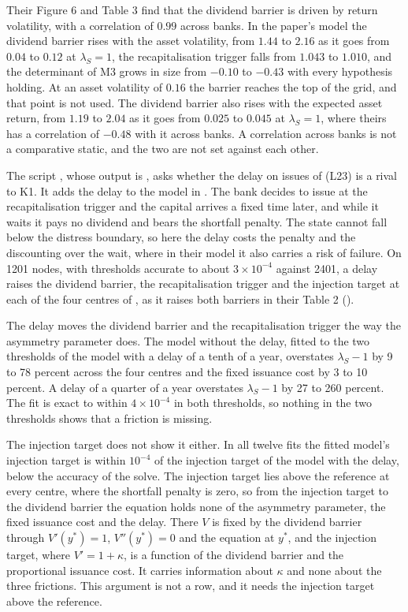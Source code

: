 Their Figure 6 and Table 3 find that the dividend barrier is driven by return
volatility, with a correlation of $0.99$ across banks. In the paper's model the
dividend barrier rises with the asset volatility, from $1.44$ to $2.16$ as it
goes from $0.04$ to $0.12$ at $\lambda_S=1$, the recapitalisation trigger falls
from $1.043$ to $1.010$, and the determinant of M3 grows in size from $-0.10$
to $-0.43$ with every hypothesis holding. At an asset volatility of $0.16$ the
barrier reaches the top of the grid, and that point is not used. The dividend
barrier also rises with the expected asset return, from $1.19$ to $2.04$ as it
goes from $0.025$ to $0.045$ at $\lambda_S=1$, where theirs has a correlation
of $-0.48$ with it across banks. A correlation across banks is not a
comparative static, and the two are not set against each other.

The script
, whose output is
, asks whether the delay on issues of
\citet{peura2006} (L23) is a rival to K1. It adds the delay to the model in
. The bank decides to issue at the
recapitalisation trigger and the capital arrives a fixed time later, and while
it waits it pays no dividend and bears the shortfall penalty. The state cannot
fall below the distress boundary, so here the delay costs the penalty and the
discounting over the wait, where in their model it also carries a risk of
failure. On 1201 nodes, with thresholds accurate to about $3\times10^{-4}$
against 2401, a delay raises the dividend barrier, the recapitalisation
trigger and the injection target at each of the four centres of
, as it raises both barriers in their Table 2
().

The delay moves the dividend barrier and the recapitalisation trigger the way
the asymmetry parameter does. The model without the delay, fitted to the two
thresholds of the model with a delay of a tenth of a year, overstates
$\lambda_S-1$ by 9 to 78 percent across the four centres and the fixed
issuance cost by 3 to 10 percent. A delay of a quarter of a year overstates
$\lambda_S-1$ by 27 to 260 percent. The fit is exact to within
$4\times10^{-4}$ in both thresholds, so nothing in the two thresholds shows
that a friction is missing.

The injection target does not show it either. In all twelve fits the fitted
model's injection target is within $10^{-4}$ of the injection target of the
model with the delay, below the accuracy of the solve. The injection target
lies above the reference at every centre, where the shortfall penalty is
zero, so from the injection target to the dividend barrier the equation holds
none of the asymmetry parameter, the fixed issuance cost and the delay. There
$V$ is fixed by the dividend barrier through $V'(y^*)=1$, $V''(y^*)=0$ and the
equation at $y^*$, and the injection target, where $V'=1+\kappa$, is a
function of the dividend barrier and the proportional issuance cost. It
carries information about $\kappa$ and none about the three frictions. This
argument is not a row, and it needs the injection target above the reference.

